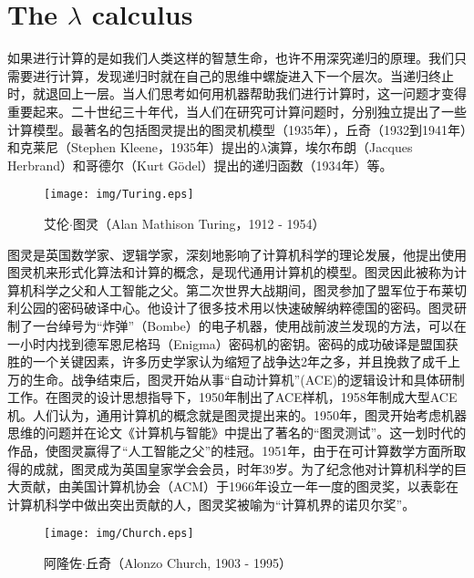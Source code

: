 \documentclass{article}
\begin{document}
\section{The $\lambda$ calculus}

如果进行计算的是如我们人类这样的智慧生命，也许不用深究递归的原理。我们只需要进行计算，发现递归时就在自己的思维中螺旋进入下一个层次。当递归终止时，就退回上一层。当人们思考如何用机器帮助我们进行计算时，这一问题才变得重要起来。二十世纪三十年代，当人们在研究可计算问题时，分别独立提出了一些计算模型。最著名的包括图灵提出的图灵机模型（1935年），丘奇（1932到1941年）和克莱尼（Stephen Kleene，1935年）提出的$\lambda$演算，埃尔布朗（Jacques Herbrand）和哥德尔（Kurt Gödel）提出的递归函数（1934年）等。

\begin{figure}[htbp]
 \centering
 \texttt{[image: img/Turing.eps]}
 \captionsetup{labelformat=empty}
 \caption{艾伦$\cdot$图灵（Alan Mathison Turing，1912 - 1954）}
 \label{fig:Turing}
\end{figure}

图灵是英国数学家、逻辑学家，深刻地影响了计算机科学的理论发展，他提出使用图灵机来形式化算法和计算的概念，是现代通用计算机的模型。图灵因此被称为计算机科学之父和人工智能之父\cite{wiki-Turing}。第二次世界大战期间，图灵参加了盟军位于布莱切利公园的密码破译中心。他设计了很多技术用以快速破解纳粹德国的密码。图灵研制了一台绰号为“炸弹”（Bombe）的电子机器，使用战前波兰发现的方法，可以在一小时内找到德军恩尼格玛（Enigma）密码机的密钥。密码的成功破译是盟国获胜的一个关键因素，许多历史学家认为缩短了战争达2年之多，并且挽救了成千上万的生命。战争结束后，图灵开始从事“自动计算机”(ACE)的逻辑设计和具体研制工作。在图灵的设计思想指导下，1950年制出了ACE样机，1958年制成大型ACE机。人们认为，通用计算机的概念就是图灵提出来的。1950年，图灵开始考虑机器思维的问题并在论文《计算机与智能》中提出了著名的“图灵测试”。这一划时代的作品，使图灵赢得了“人工智能之父”的桂冠。1951年，由于在可计算数学方面所取得的成就，图灵成为英国皇家学会会员，时年39岁。为了纪念他对计算机科学的巨大贡献，由美国计算机协会（ACM）于1966年设立一年一度的图灵奖，以表彰在计算机科学中做出突出贡献的人，图灵奖被喻为“计算机界的诺贝尔奖”。

\begin{wrapfigure}{R}{0.3\textwidth}
 \centering
 \texttt{[image: img/Church.eps]}
 \captionsetup{labelformat=empty}
 \caption{阿隆佐$\cdot$丘奇（Alonzo Church, 1903 - 1995）}
 \label{fig:Church}
\end{wrapfigure}
\end{document}
